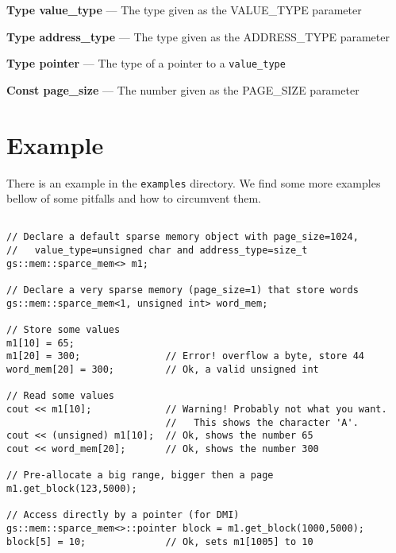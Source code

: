 \documentclass[12pt,oneside]{gsbook}
\begin{document}
\vspace{5pt}

\textbf{Type value\_type} --- The type given as the VALUE\_TYPE parameter

\textbf{Type address\_type} --- The type given as the ADDRESS\_TYPE parameter

\textbf{Type pointer} --- The type of a pointer to a \texttt{value\_type}

\textbf{Const page\_size} --- The number given as the PAGE\_SIZE parameter


\chapter{Example}
\label{EXAMPLE}

There is an example in the \texttt{examples} directory. We find some
more examples bellow of some pitfalls and how to circumvent them.

\begin{lstlisting}

// Declare a default sparse memory object with page_size=1024,
//   value_type=unsigned char and address_type=size_t
gs::mem::sparce_mem<> m1;

// Declare a very sparse memory (page_size=1) that store words
gs::mem::sparce_mem<1, unsigned int> word_mem;

// Store some values
m1[10] = 65;
m1[20] = 300;               // Error! overflow a byte, store 44
word_mem[20] = 300;         // Ok, a valid unsigned int

// Read some values
cout << m1[10];             // Warning! Probably not what you want.
                            //   This shows the character 'A'.
cout << (unsigned) m1[10];  // Ok, shows the number 65
cout << word_mem[20];       // Ok, shows the number 300

// Pre-allocate a big range, bigger then a page
m1.get_block(123,5000);

// Access directly by a pointer (for DMI)
gs::mem::sparce_mem<>::pointer block = m1.get_block(1000,5000);
block[5] = 10;              // Ok, sets m1[1005] to 10
\end{lstlisting}
\end{document}
